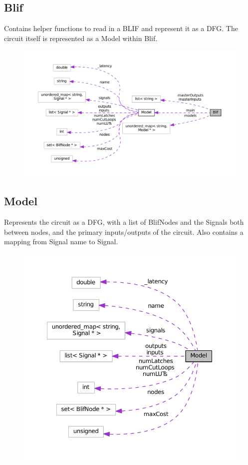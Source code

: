 \documentclass[12pt,final,oneside]{article} %
\begin{document}
   \subsection{Blif}
      Contains helper functions to read in a \ac{BLIF} and represent it as a \ac{DFG}.
      The circuit itself is represented as a Model within Blif.
      \begin{figure}
         \includegraphics{doxygen/classBlif__coll__graph.pdf}
      \end{figure}
      
   \subsection{Model}
      Represents the circuit as a \ac{DFG}, with a list of BlifNodes and the Signals both between nodes, and the primary inputs/outputs of the circuit.
      Also contains a mapping from Signal name to Signal.
      \begin{figure}
         \includegraphics{doxygen/classModel__coll__graph.pdf}
      \end{figure}
\end{document}
